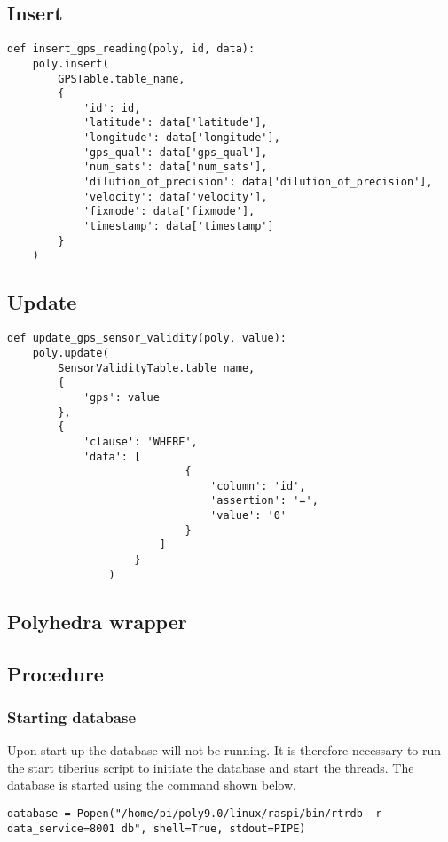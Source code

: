 \subsection{Insert}
\begin{lstlisting} 
def insert_gps_reading(poly, id, data):
    poly.insert(
        GPSTable.table_name,
        {
            'id': id,
            'latitude': data['latitude'],
            'longitude': data['longitude'],
            'gps_qual': data['gps_qual'],
            'num_sats': data['num_sats'],
            'dilution_of_precision': data['dilution_of_precision'],
            'velocity': data['velocity'],
            'fixmode': data['fixmode'],
            'timestamp': data['timestamp']
        }
    )
\end{lstlisting}  
\subsection{Update}
\begin{lstlisting} 
def update_gps_sensor_validity(poly, value):
    poly.update(
        SensorValidityTable.table_name,
        {
            'gps': value
        },
        {
            'clause': 'WHERE',
            'data': [
                            {
                                'column': 'id',
                                'assertion': '=',
                                'value': '0'
                            }
                        ]
                    }
                )
\end{lstlisting}

\subsection{Polyhedra wrapper}





\subsection{Procedure}
\subsubsection{Starting database}
Upon start up the database will not be running. It is therefore necessary to run the start tiberius script to initiate the database and start the threads. The database is started using the command shown below.

\begin{lstlisting} 
database = Popen("/home/pi/poly9.0/linux/raspi/bin/rtrdb -r data_service=8001 db", shell=True, stdout=PIPE)
\end{lstlisting}


